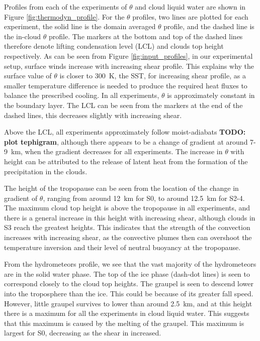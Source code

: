 \documentclass[11pt,a4paper]{article}
\newcommand\todo[1]{\textbf{TODO: #1}}
\begin{document}
Profiles from each of the experiments of $\theta$ and cloud liquid water are shown in Figure \ref{fig:thermodyn_profile}. For the $\theta$ profiles, two lines are plotted for each experiment, the solid line is the domain averaged $\theta$ profile, and the dashed line is the in-cloud $\theta$ profile. The markers at the bottom and top of the dashed lines therefore denote lifting condensation level (LCL) and clouds top height respectively. As can be seen from Figure \ref{fig:input_profiles}, in our experimental setup, surface winds increase with increasing shear profile. This explains why the surface value of $\theta$ is closer to \SI{300}{K}, the SST, for increasing shear profile, as a smaller temperature difference is needed to produce the required heat fluxes to balance the prescribed cooling. In all experiments, $\theta$ is approximately constant in the boundary layer. The LCL can be seen from the markers at the end of the dashed lines, this decreases slightly with increasing shear. 

Above the LCL, all experiments approximately follow moist-adiabats \todo{plot tephigram}, although there appears to be a change of gradient at around \SI{7}{}-\SI{9}{km}, when the gradient decreases for all experiments. The increase in $\theta$ with height can be attributed to the release of latent heat from the formation of the precipitation in the clouds.

The height of the tropopause can be seen from the location of the change in gradient of $\theta$, ranging from around \SI{12}{km} for S0, to around \SI{12.5}{km} for S2-4. The maximum cloud top height is above the tropopause in all experiments, and there is a general increase in this height with increasing shear, although clouds in S3 reach the greatest heights. This indicates that the strength of the convection increases with increasing shear, as the convective plumes then can overshoot the temperature inversion and their level of neutral buoyancy at the tropopause. 

From the hydrometeors profile, we see that the vast majority of the hydrometeors are in the solid water phase. The top of the ice phase (dash-dot lines) is seen to correspond closely to the cloud top heights. The graupel is seen to descend lower into the troposphere than the ice. This could be because of its greater fall speed. However, little graupel survives to lower than around \SI{2.5}{km}, and at this height there is a maximum for all the experiments in cloud liquid water. This suggests that this maximum is caused by the melting of the graupel. This maximum is largest for S0, decreasing as the shear in increased. 
\end{document}

